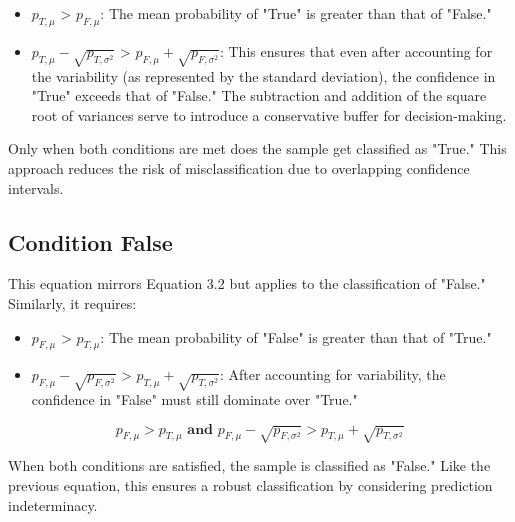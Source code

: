 \begin{itemize}
    \item \(p_{T,\mu}\) > \(p_{F,\mu}\): The mean probability of "True" is greater than that of "False."
    \item \(p_{T,\mu} - \sqrt{p_{T,\sigma^2}}\) > \( p_{F,\mu} + \sqrt{p_{F,\sigma^2}}\): This ensures that even after accounting for the variability (as represented by the standard deviation), the confidence in "True" exceeds that of "False." The subtraction and addition of the square root of variances serve to introduce a conservative buffer for decision-making.
\end{itemize}

Only when both conditions are met does the sample get classified as "True." This approach reduces the risk of misclassification due to overlapping confidence intervals.

\subsection{Condition False}

This equation mirrors Equation 3.2 but applies to the classification of "False." Similarly, it requires:

\begin{itemize}
    \item \(p_{F,\mu}\) > \(p_{T,\mu}\): The mean probability of "False" is greater than that of "True."
    \item \(p_{F,\mu} - \sqrt{p_{F,\sigma^2}}\) > \( p_{T,\mu} + \sqrt{p_{T,\sigma^2}}\): After accounting for variability, the confidence in "False" must still dominate over "True."
\end{itemize}

\begin{equation}
p_{F,\mu} > p_{T,\mu} \textbf{ and } p_{F,\mu} - \sqrt{p_{F,\sigma^2}} > p_{T,\mu} + \sqrt{p_{T,\sigma^2}}
\end{equation}

When both conditions are satisfied, the sample is classified as "False." Like the previous equation, this ensures a robust classification by considering prediction indeterminacy.

